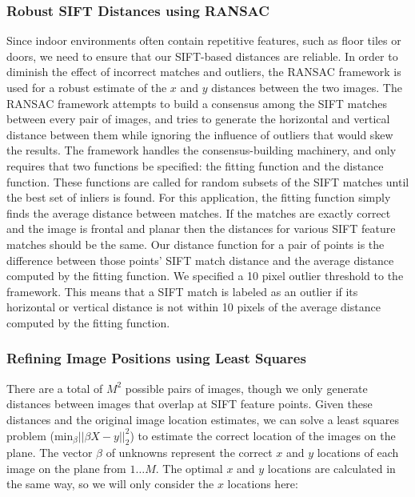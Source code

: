 \documentclass[10pt,twocolumn,letterpaper]{article}
\begin{document}
\subsubsection{Robust SIFT Distances using RANSAC}
Since indoor environments often contain repetitive features, such as
floor tiles or doors, we need to ensure that our SIFT-based distances
are reliable. In order to diminish the effect of incorrect matches and
outliers, the RANSAC framework \cite{fischler1981random} is used for a
robust estimate of the $x$ and $y$ distances between the two
images. The RANSAC framework attempts to build a consensus among the
SIFT matches between every pair of images, and tries to generate the
horizontal and vertical distance between them while ignoring the
influence of outliers that would skew the results. The framework
handles the consensus-building machinery, and only requires that two
functions be specified: the fitting function and the distance
function. These functions are called for random subsets of the SIFT
matches until the best set of inliers is found. For this application,
the fitting function simply finds the average distance between
matches. If the matches are exactly correct and the image is frontal
and planar then the distances for various SIFT feature matches should
be the same. Our distance function for a pair of points is the
difference between those points' SIFT match distance and the average
distance computed by the fitting function. We specified a 10 pixel
outlier threshold to the framework. This means that a SIFT match is
labeled as an outlier if its horizontal or vertical distance is not
within 10 pixels of the average distance computed by the fitting
function.

\subsubsection{Refining Image Positions using Least Squares}

There are a total of $M^{2}$ possible pairs of images, though we only
generate distances between images that overlap at SIFT feature
points. Given these distances and the original image location
estimates, we can solve a least squares problem ($\textrm{min}_{\beta}
||\beta X - y||_2^2 $) to estimate the correct location of the images
on the plane. The vector $\beta$ of unknowns represent the correct $x$
and $y$ locations of each image on the plane from $1 \dots M$. The
optimal $x$ and $y$ locations are calculated in the same way, so we
will only consider the $x$ locations here:
\end{document}
